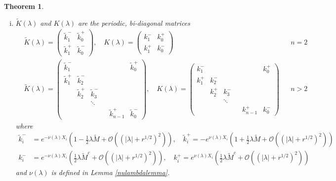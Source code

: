 \documentclass[10pt,reqno]{amsart}
\theoremstyle{plain}
\newtheorem{theorem}{Theorem}
\theoremstyle{definition}
\theoremstyle{remark}
\numberwithin{theorem}{section}
\numberwithin{equation}{section}
\begin{document}
\begin{theorem}
\begin{enumerate}[(i)]
\item $\tilde{K}(\lambda)$ and $K(\lambda)$ are the periodic, bi-diagonal matrices
\begin{align*}
&\tilde{K}(\lambda) =  
\begin{pmatrix}
\tilde{k}_1^- & \tilde{k}_0^+ \\
\tilde{k}_1^+ & \tilde{k}_0^-
\end{pmatrix}, \quad
K(\lambda) =  
\begin{pmatrix}
k_1^- & k_0^+ \\
k_1^+ & k_0^-
\end{pmatrix} && n = 2 \\
&\tilde{K}(\lambda) =  
\begin{pmatrix}
\tilde{k}_1^- & & & & & \tilde{k}_0^+ \\
\tilde{k}_1^+ & \tilde{k}_2^- \\
& \tilde{k}_2^+ & \tilde{k}_3^- \\
  & & \ddots & && \\
& & & & \tilde{k}_{n-1}^+ & \tilde{k}_0^-
\end{pmatrix}, \quad
K(\lambda) =  
\begin{pmatrix}
k_1^- & & & & & k_0^+ \\
k_1^+ & k_2^- \\
& k_2^+ & k_3^- \\
  & & \ddots & && \\
& & & & k_{n-1}^+ & k_0^-
\end{pmatrix} && n > 2
\end{align*}
where
\begin{align*}
\tilde{k}_i^- &= e^{-\nu(\lambda)X_i}\left(1 - \frac{1}{2}\lambda \tilde{M} + \mathcal{O}((|\lambda| + r^{1/2})^2) \right),
\quad \tilde{k}_i^+ = -e^{\nu(\lambda)X_i}\left(1 + \frac{1}{2}\lambda \tilde{M} + \mathcal{O}((|\lambda| + r^{1/2})^2) \right) \\
k_i^- &= e^{-\nu(\lambda)X_i}\left(\frac{1}{2}\lambda \tilde{M}^c + \mathcal{O}((|\lambda| + r^{1/2})^2) \right), \quad
k_i^+ = e^{\nu(\lambda)X_i}\left(\frac{1}{2}\lambda \tilde{M}^c + \mathcal{O}((|\lambda| + r^{1/2})^2) \right)
\end{align*}
and $\nu(\lambda)$ is defined in Lemma \ref{nulambdalemma}.


\end{enumerate}
\end{theorem}
\end{document}
